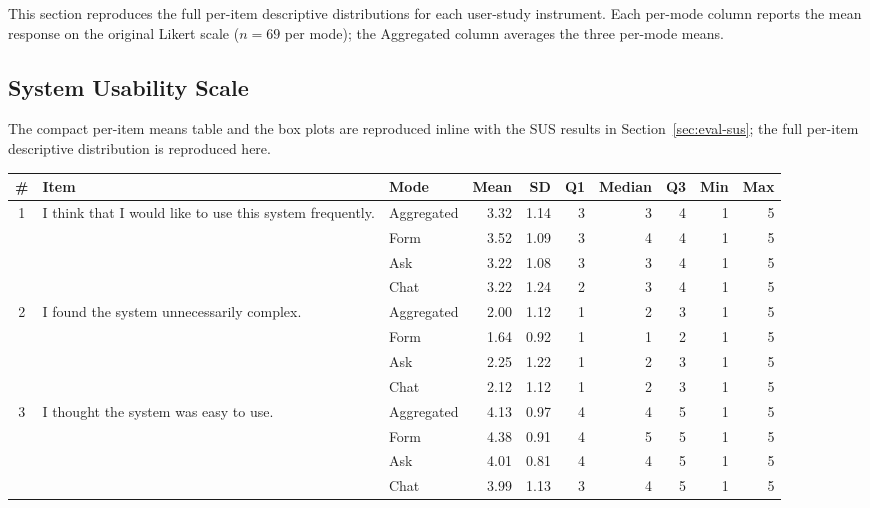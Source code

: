 This section reproduces the full per-item descriptive
distributions for each user-study instrument. Each per-mode column
reports the mean response on the original Likert scale ($n = 69$
per mode); the Aggregated column averages the three per-mode means.

\subsection{System Usability Scale}
\label{app:items-sus}

The compact per-item means table and the box plots are reproduced
inline with the SUS results in Section~\ref{sec:eval-sus}; the
full per-item descriptive distribution is reproduced here.

\begin{table}
\centering
\footnotesize
\begin{tabularx}{\textheight}{@{}c X l r r r r r r r@{}}
\toprule
\# & Item & Mode & Mean & SD & Q1 & Median & Q3 & Min & Max \\
\midrule
\multirow{4}{*}{1}  & \multirow{4}{*}{I think that I would like to use this system frequently.}
                    & Aggregated  & 3.32 & 1.14 & 3 & 3 & 4 & 1 & 5 \\
                    & & Form & 3.52 & 1.09 & 3 & 4 & 4 & 1 & 5 \\
                    & & Ask  & 3.22 & 1.08 & 3 & 3 & 4 & 1 & 5 \\
                    & & Chat & 3.22 & 1.24 & 2 & 3 & 4 & 1 & 5 \\
\midrule
\multirow{4}{*}{2}  & \multirow{4}{*}{I found the system unnecessarily complex.}
                    & Aggregated  & 2.00 & 1.12 & 1 & 2 & 3 & 1 & 5 \\
                    & & Form & 1.64 & 0.92 & 1 & 1 & 2 & 1 & 5 \\
                    & & Ask  & 2.25 & 1.22 & 1 & 2 & 3 & 1 & 5 \\
                    & & Chat & 2.12 & 1.12 & 1 & 2 & 3 & 1 & 5 \\
\midrule
\multirow{4}{*}{3}  & \multirow{4}{*}{I thought the system was easy to use.}
                    & Aggregated  & 4.13 & 0.97 & 4 & 4 & 5 & 1 & 5 \\
                    & & Form & 4.38 & 0.91 & 4 & 5 & 5 & 1 & 5 \\
                    & & Ask  & 4.01 & 0.81 & 4 & 4 & 5 & 1 & 5 \\
                    & & Chat & 3.99 & 1.13 & 3 & 4 & 5 & 1 & 5 \\

\end{tabularx}
\end{table}
